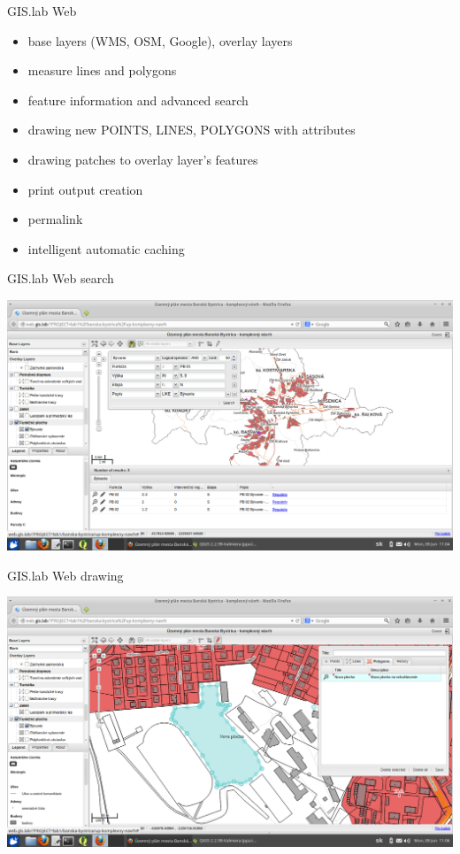 \documentclass[12pt]{beamer}
\begin{document}
\begin{frame}{GIS.lab Web}
	\begin{itemize}[<+->]
		\item base layers (WMS, OSM, Google), overlay layers
		\item measure lines and polygons
		\item feature information and advanced search
		\item drawing new POINTS, LINES, POLYGONS with attributes
		\item drawing patches to overlay layer's features
		\item print output creation
		\item permalink
		\item intelligent automatic caching
	\end{itemize}
\end{frame}


\begin{frame}{GIS.lab Web search}
	\begin{center}
		\includegraphics[keepaspectratio=true,height=0.7\textheight]{images/real-world-example/project-gislab-web-search.png}
	\end{center}
\end{frame}


\begin{frame}{GIS.lab Web drawing}
	\begin{center}
		\includegraphics[keepaspectratio=true,height=0.7\textheight]{images/real-world-example/project-gislab-web-drawing.png}
	\end{center}
\end{frame}
\end{document}
